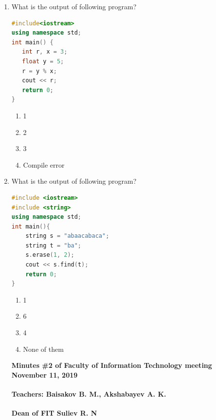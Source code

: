 \documentclass[10pt]{article}
\begin{document}
\begin{enumerate}
\item What is the output of following program?
\begin{lstlisting}[language=C++]
#include<iostream>
using namespace std;
int main() { 
   int r, x = 3;
   float y = 5;
   r = y % x;
   cout << r; 
   return 0;
}
\end{lstlisting}
\begin{multicols}{4}
\begin{enumerate}
    \item 1
    \item 2
    \item 3
    \item Compile error 
\end{enumerate}
\end{multicols}


\item What is the output of following program?
\begin{lstlisting}[language=C++]
#include <iostream>
#include <string>
using namespace std;
int main(){
    string s = "abaacabaca";
    string t = "ba";
    s.erase(1, 2); 
    cout << s.find(t);
    return 0;
}
\end{lstlisting}
\begin{multicols}{4}
\begin{enumerate}
    \item 1
    \item 6
    \item 4 
    \item None of them
\end{enumerate}
\end{multicols}

\textbf{
Minutes \#2 of Faculty of Information Technology meeting November 11, 2019 \\\\
Teachers: Baisakov B. M., Akshabayev A. K. \\\\ 
Dean of FIT Suliev R. N \\\\
}


\end{enumerate}
\end{document}

